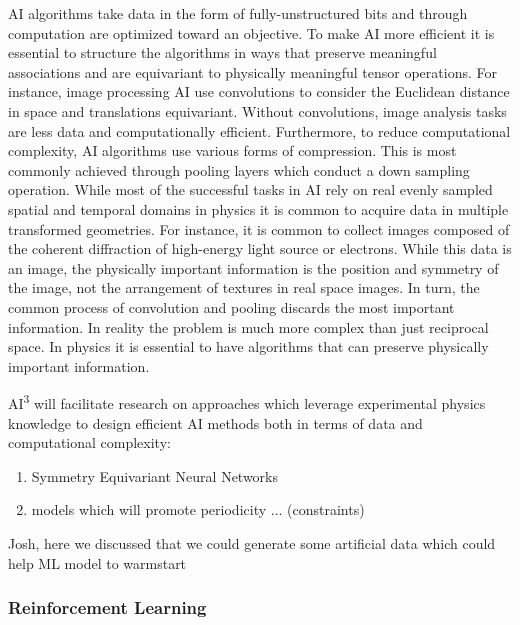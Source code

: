  \label{physics inspired}
AI algorithms take data in the form of fully-unstructured bits and through computation are optimized toward an objective.
To make AI more efficient it is essential to structure the algorithms in ways that preserve meaningful associations and are equivariant to physically meaningful tensor operations.
For instance, image processing AI use convolutions to consider the Euclidean distance in space and translations equivariant.
Without convolutions, image analysis tasks are less data and computationally efficient. 
Furthermore, to reduce computational complexity, AI algorithms use various forms of compression.
This is most commonly achieved through pooling layers which conduct a down sampling operation.
While most of the successful tasks in AI rely on real evenly sampled spatial and temporal domains in physics it is common to acquire data in multiple transformed geometries.
For instance, it is common to collect images composed of the coherent diffraction of high-energy light source or electrons. 
While this data is an image, the physically important information is the position and symmetry of the image, not the arrangement of textures in real space images. In turn, the common process of convolution and pooling discards the most important information. 
In reality the problem is much more complex than just reciprocal space. In physics it is essential to have algorithms that can preserve physically important information.

AI\textsuperscript{3} will facilitate research on approaches which leverage experimental physics knowledge to design efficient AI methods both in terms of data and computational complexity:
\begin{enumerate}[noitemsep,topsep=0pt]
    \item Symmetry Equivariant Neural Networks
    
    \item {} models which will promote periodicity ... (constraints)
\end{enumerate}


Josh, here we discussed that we could generate some artificial data which could help ML model to warmstart 

\subsubsection{Reinforcement Learning}



